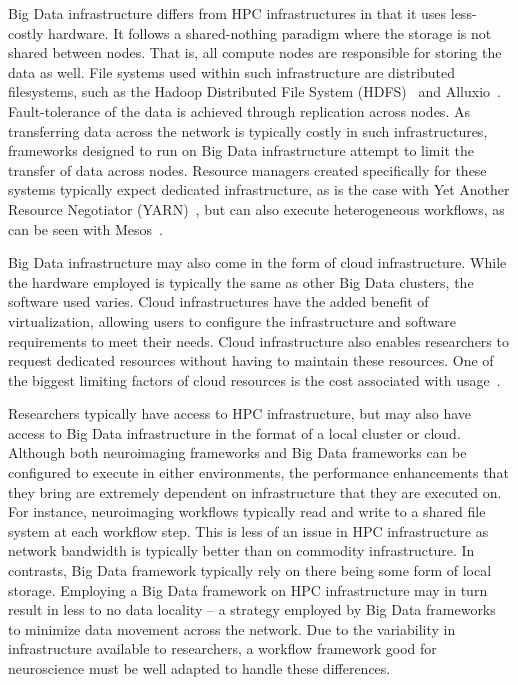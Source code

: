 \documentclass{report}
\begin{document}
            Big Data infrastructure differs from HPC infrastructures in that
            it uses less-costly hardware. It follows a shared-nothing paradigm
            where the storage is not shared between nodes. That is, all compute
            nodes are responsible for storing the data as well. File systems
            used within such infrastructure are distributed filesystems, such 
            as the
            Hadoop Distributed File System (HDFS)~\cite{5496972} and 
            Alluxio~\cite{Li:2014:TRM:2670979.2670985}.
            Fault-tolerance of the data is achieved through replication across
            nodes. As transferring data across the network is typically costly 
            in such infrastructures, frameworks designed to run on Big Data 
            infrastructure attempt to limit the transfer of data across nodes. 
            Resource managers created specifically for these systems
            typically expect dedicated infrastructure, as is the case with 
            Yet Another Resource Negotiator 
            (YARN)~\cite{Vavilapalli:2013:AHY:2523616.2523633}, but can also 
            execute heterogeneous workflows, as can be seen with 
            Mesos~\cite{hindman2011mesos}.

            Big Data infrastructure may also come in the form of cloud 
            infrastructure.
            While the hardware employed is typically the same as other
            Big Data clusters, the software used varies. Cloud infrastructures
            have the added benefit of virtualization, allowing users to 
            configure the infrastructure and software requirements to meet their
            needs. Cloud infrastructure also enables researchers to request
            dedicated resources without having to maintain these resources. One
            of the biggest limiting factors of cloud resources is the cost 
            associated with usage~\cite{10.3389/fninf.2017.00063}.

            Researchers typically have access to HPC infrastructure, but may
            also have access to Big Data infrastructure in the format of a 
            local cluster or cloud. Although both neuroimaging frameworks and
            Big Data frameworks can be configured to execute in either 
            environments,
            the performance enhancements that they bring are extremely
            dependent on infrastructure that they are executed on. For instance,
            neuroimaging workflows typically read and write to a shared file
            system at each workflow step. This is less of an issue in HPC 
            infrastructure as network bandwidth is typically better than on 
            commodity infrastructure. In contrasts, Big Data framework typically
            rely on there being some form of local storage. Employing a Big Data
            framework on HPC infrastructure may in turn result in less to no 
            data locality -- a strategy employed by Big Data frameworks to 
            minimize data movement across the network. Due to the variability in
            infrastructure available to researchers, a workflow framework good
            for neuroscience must be well adapted to handle these differences.
\end{document}
